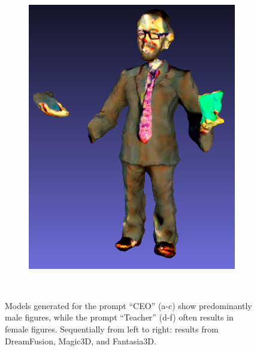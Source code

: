 \begin{figure}[H]
\begin{subfigure}[b]{0.1289\textwidth}
        \caption{}
    \end{subfigure}
    \begin{subfigure}[b]{0.2603\textwidth}
        \centering
        \includegraphics[width=\textwidth]{figures/future/bias_teacher_fantasia3d.png}
        \caption{}
    \end{subfigure}
    \caption{Models generated for the prompt ``CEO'' (a-c) show predominantly male figures, while the prompt ``Teacher'' (d-f) often results in female figures. Sequentially from left to right: results from DreamFusion, Magic3D, and Fantasia3D.}~\label{fig:biasCEOTeacher}
\end{figure}


